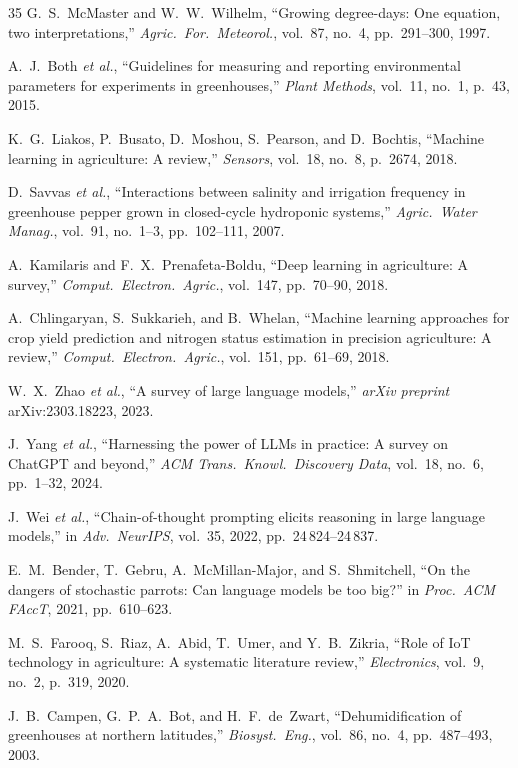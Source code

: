 \documentclass[journal,10pt,twocolumn]{IEEEtran}
\begin{document}
\begin{thebibliography}{35}
G.~S.~McMaster and W.~W.~Wilhelm, ``Growing degree-days: One equation,
two interpretations,'' \emph{Agric.\ For.\ Meteorol.}, vol.~87,
no.~4, pp.~291--300, 1997.

A.~J.~Both \emph{et al.}, ``Guidelines for measuring and reporting
environmental parameters for experiments in greenhouses,''
\emph{Plant Methods}, vol.~11, no.~1, p.~43, 2015.

K.~G.~Liakos, P.~Busato, D.~Moshou, S.~Pearson, and D.~Bochtis,
``Machine learning in agriculture: A review,'' \emph{Sensors},
vol.~18, no.~8, p.~2674, 2018.

D.~Savvas \emph{et al.}, ``Interactions between salinity and
irrigation frequency in greenhouse pepper grown in closed-cycle
hydroponic systems,'' \emph{Agric.\ Water Manag.}, vol.~91,
no.~1--3, pp.~102--111, 2007.

A.~Kamilaris and F.~X.~Prenafeta-Boldu, ``Deep learning in
agriculture: A survey,'' \emph{Comput.\ Electron.\ Agric.}, vol.~147,
pp.~70--90, 2018.

A.~Chlingaryan, S.~Sukkarieh, and B.~Whelan, ``Machine learning
approaches for crop yield prediction and nitrogen status estimation in
precision agriculture: A review,'' \emph{Comput.\ Electron.\ Agric.},
vol.~151, pp.~61--69, 2018.

W.~X.~Zhao \emph{et al.}, ``A survey of large language models,''
\emph{arXiv preprint} arXiv:2303.18223, 2023.

J.~Yang \emph{et al.}, ``Harnessing the power of LLMs in practice:
A survey on ChatGPT and beyond,'' \emph{ACM Trans.\ Knowl.\ Discovery
Data}, vol.~18, no.~6, pp.~1--32, 2024.

J.~Wei \emph{et al.}, ``Chain-of-thought prompting elicits reasoning
in large language models,'' in \emph{Adv.\ NeurIPS}, vol.~35, 2022,
pp.~24\,824--24\,837.

E.~M.~Bender, T.~Gebru, A.~McMillan-Major, and S.~Shmitchell, ``On
the dangers of stochastic parrots: Can language models be too big?''
in \emph{Proc.\ ACM FAccT}, 2021, pp.~610--623.

M.~S.~Farooq, S.~Riaz, A.~Abid, T.~Umer, and Y.~B.~Zikria, ``Role
of IoT technology in agriculture: A systematic literature review,''
\emph{Electronics}, vol.~9, no.~2, p.~319, 2020.

J.~B.~Campen, G.~P.~A.~Bot, and H.~F.~de~Zwart, ``Dehumidification
of greenhouses at northern latitudes,'' \emph{Biosyst.\ Eng.},
vol.~86, no.~4, pp.~487--493, 2003.

\end{thebibliography}
\end{document}
